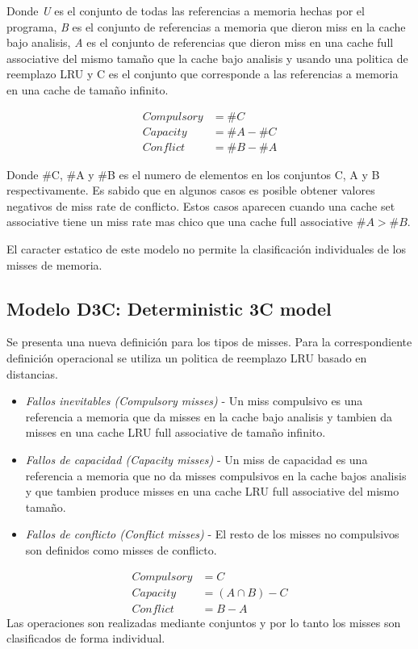 \documentclass{article}
\begin{document}
Donde \textit{U} es el conjunto de todas las referencias a memoria hechas por el programa, \textit{B} es el conjunto de referencias a memoria que dieron miss en la cache bajo analisis, 
\textit{A} es el conjunto de referencias que dieron miss en una cache full associative del mismo tamaño que la cache bajo analisis y usando una politica de reemplazo LRU y C es el conjunto que corresponde a las referencias a memoria en una cache de tamaño infinito.

\begin{align*}
    Compulsory &= \#C \\
    Capacity &= \#A - \#C \\
    Conflict &= \#B - \#A
\end{align*} 

Donde \#C, \#A y \#B es el numero de elementos en los conjuntos C, A y B respectivamente. 
Es sabido que en algunos casos es posible obtener valores negativos de miss rate de conflicto. Estos casos aparecen cuando una cache set associative tiene un miss rate mas chico que una cache full associative \(\#A > \#B\). 

El caracter estatico de este modelo no permite la clasificación individuales de los misses de memoria.

\subsection{Modelo D3C: Deterministic 3C model}
Se presenta una nueva definición para los tipos de misses. Para la correspondiente definición operacional se utiliza un politica de reemplazo LRU basado en distancias.

\begin{itemize} 
    \item \textit{Fallos inevitables (Compulsory misses)} - Un miss compulsivo es una referencia a memoria que da misses en la cache bajo analisis y tambien da misses en una cache LRU full associative de tamaño infinito.
    \item \textit{Fallos de capacidad (Capacity misses)} - Un miss de capacidad es una referencia a memoria que no da misses compulsivos en la cache bajos analisis y que tambien produce misses en una cache LRU full associative del mismo tamaño.
    \item \textit{Fallos de conflicto (Conflict misses)} - El resto de los misses no compulsivos son definidos como misses de conflicto.
\end{itemize}

\begin{align*}
    Compulsory &= C \\
    Capacity &= (A \cap B) - C \\
    Conflict &= B - A
\end{align*} 
Las operaciones son realizadas mediante conjuntos y por lo tanto los misses son clasificados de forma individual.
\end{document}
